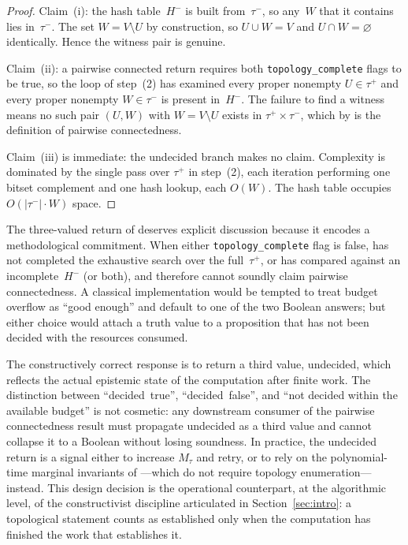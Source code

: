 \documentclass[11pt,a4paper]{article}
\theoremstyle{plain}
\theoremstyle{definition}
\newcommand{\taufwd}{\tau^{+}}
\newcommand{\taubwd}{\tau^{-}}
\begin{document}
\begin{proof}
Claim~(i): the hash table~$H^{-}$ is built from~$\taubwd$, so any~$W$ that
it contains lies in~$\taubwd$.  The set $W = V \setminus U$ by
construction, so $U \cup W = V$ and $U \cap W = \varnothing$ identically.
Hence the witness pair is genuine.

Claim~(ii): a \textup{pairwise connected} return requires both
\texttt{topology\_complete} flags to be \textup{true}, so the loop of
step~(2) has examined every proper nonempty $U \in \taufwd$ and every
proper nonempty $W \in \taubwd$ is present in~$H^{-}$.  The failure to
find a witness means no such pair $(U, W)$ with $W = V \setminus U$ exists
in $\taufwd \times \taubwd$, which by
 is the definition of pairwise
connectedness.

Claim~(iii) is immediate: the \textup{undecided} branch makes no claim.
Complexity is dominated by the single pass over $\taufwd$ in step~(2),
each iteration performing one bitset complement and one hash lookup, each
$O(W)$.  The hash table occupies $O(|\taubwd| \cdot W)$ space.
\end{proof}

The three-valued return of  deserves explicit discussion
because it encodes a methodological commitment.  When either
\texttt{topology\_complete} flag is \textup{false}, 
has not completed the exhaustive search over the full~$\taufwd$, or has
compared against an incomplete~$H^{-}$ (or both), and therefore cannot
soundly claim pairwise connectedness.  A classical implementation would be
tempted to treat budget overflow as ``good enough'' and default to one of
the two Boolean answers; but either choice would attach a truth value to a
proposition that has not been decided with the resources consumed.

The constructively correct response is to return a third value,
\textup{undecided}, which reflects the actual epistemic state of the
computation after finite work.  The distinction between
``decided~\textup{true}'', ``decided~\textup{false}'', and ``not decided
within the available budget'' is not cosmetic: any downstream consumer of
the pairwise connectedness result must propagate \textup{undecided} as a
third value and cannot collapse it to a Boolean without losing soundness.
In practice, the \textup{undecided} return is a signal either to increase
$M_{\tau}$ and retry, or to rely on the polynomial-time marginal
invariants of ---which do not require
topology enumeration---instead.  This design decision is the operational
counterpart, at the algorithmic level, of the constructivist discipline
articulated in Section~\ref{sec:intro}: a topological statement counts as
established only when the computation has finished the work that
establishes it.
\end{document}

